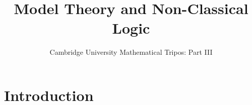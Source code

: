 \documentclass{article}
\title{Model Theory and Non-Classical Logic}
\author{Cambridge University Mathematical Tripos: Part III}
\begin{document}
\maketitle

\tableofcontentsnewpage{}

\section{Introduction}

\end{document}
